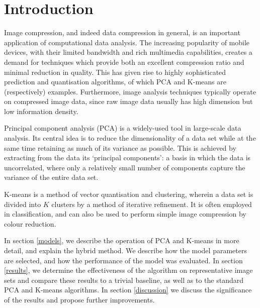 \section{Introduction}
Image compression, and indeed data compression in general, is an important application of computational data analysis. The increasing popularity of mobile devices, with their limited bandwidth and rich multimedia capabilities, creates a demand for techniques which provide both an excellent compression ratio and minimal reduction in quality. This has given rise to highly sophisticated prediction and quantisation algorithms, of which PCA and K-means are (respectively) examples. Furthermore, image analysis techniques typically operate on compressed image data, since raw image data usually has high dimension but low information density.

Principal component analysis (PCA) is a widely-used tool in large-scale data analysis. Its central idea is to reduce the dimensionality of a data set while at the same time retaining as much of its variance as possible. This is achieved by extracting from the data its `principal components': a basis in which the data is uncorrelated, where only a relatively small number of components capture the variance of the entire data set.

K-means is a method of vector quantisation and clustering, wherein a data set is divided into $K$ clusters by a method of iterative refinement. It is often employed in classification, and can also be used to perform simple image compression by colour reduction.


In section \ref{models}, we describe the operation of PCA and K-means in more detail, and explain the hybrid method. We describe how the model parameters are selected, and how the performance of the model was evaluated. In section \ref{results}, we determine the effectiveness of the algorithm on representative image sets and compare these results to a trivial baseline, as well as to the standard PCA and K-means algorithms. In section \ref{discussion} we discuss the significance of the results and propose further improvements.
